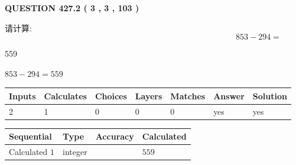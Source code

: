 \documentclass{ctexart}
\begin{document}
\vspace{0.2in}
  
{\textbf{\Large{QUESTION
427.2 
 ( 3 , 3 , 103 )
}}}
  
  
 
请计算:
\begin{equation}
853 -   %
294 = \nonumber
\end{equation}
 
 
 
\noindent{}
 
 

559
 
 
\noindent{}
 
 

 
 
 
\noindent{}
 
 

$ %
853 -  %
294=   %
559$
 
 
\noindent{}
 
 

 
   
   
   
   
\noindent\begin{tabular}{|l|l|l|l|l|l|l|}
 \hline
Inputs & Calculates & Choices & Layers & Matches & Answer & Solution \\ \hline
 2  & 
 1  & 
 0
  & 
 0  & 
 0  & 
  yes & 
  yes 
  \\ \hline
 \end{tabular}
   
   
   
   
\noindent{}
   
   
  
  
\noindent\begin{tabular}{|l|l|l|l|}
\hline
 Sequential & Type & Accuracy & Calculated \\ 
\hline
 
 
  Calculated $  1 $ & integer &  & 
  $ 559 $ 
 \\  \hline  
 \end{tabular}
   
   
   
\end{document}
